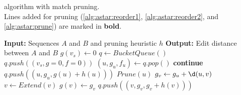 \begin{algorithm}[H]
  \caption{
    \A algorithm with match pruning.\\
    Lines added for pruning
    (\ref{alg:astar:reorder1}, \ref{alg:astar:reorder2}, and \ref{alg:astar:prune})
    are marked in \textbf{bold}.
  }\label{alg:astar}
\fontfamily{\sfdefault}\selectfont
\begin{algorithmic}[1]
\State \textbf{Input:} Sequences $A$ and $B$ and pruning heuristic $h$
\State \textbf{Output:} Edit distance between $A$ and $B$
\State $g(v_s) \gets 0$
\State $q \gets BucketQueue()$
\State $q.push((v_s, g{=}0, f{=}0))$
\Repeat
  \State $(u, g_u, f_u) \gets q.pop()$
    \State \textbf{continue}
  \boldnext
    \label{alg:astar:reorder1}
  \boldnext
    \State $q.push((u, g_u, g(u) + h(u)))$
    \label{alg:astar:reorder2}
  \Else
  \boldnext
  \State $Prune(u)$
    \label{alg:astar:prune}
     \State $g_v \gets g_u + \d(u, v)$
     \State $v \gets Extend(v)$
       \label{alg:astar:open}
       \State $g(v) \gets g_v$
       \State $q.push((v, g_v, g_v + h(v)))$
     \EndIf
   \EndFor
   \EndIf
{}
\State {}
\EndFunction
\end{algorithmic}
\end{algorithm}
